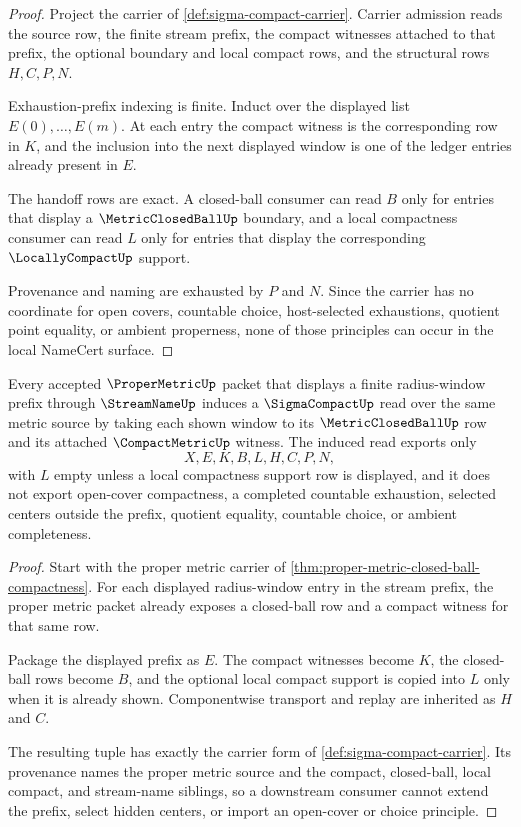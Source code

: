 \begin{proof}
Project the carrier of \autoref{def:sigma-compact-carrier}. Carrier admission reads the source row, the finite stream prefix, the compact witnesses attached to that prefix, the optional boundary and local compact rows, and the structural rows $H,C,P,N$.

Exhaustion-prefix indexing is finite. Induct over the displayed list $E(0),\ldots,E(m)$. At each entry the compact witness is the corresponding row in $K$, and the inclusion into the next displayed window is one of the ledger entries already present in $E$.

The handoff rows are exact. A closed-ball consumer can read $B$ only for entries that display a $\MetricClosedBallUp$ boundary, and a local compactness consumer can read $L$ only for entries that display the corresponding $\LocallyCompactUp$ support.

Provenance and naming are exhausted by $P$ and $N$. Since the carrier has no coordinate for open covers, countable choice, host-selected exhaustions, quotient point equality, or ambient properness, none of those principles can occur in the local NameCert surface.
\end{proof}

\begin{theorem}\label{thm:sigma-compact-proper-metric-exhaustion}
Every accepted $\ProperMetricUp$ packet that displays a finite radius-window prefix through $\StreamNameUp$ induces a $\SigmaCompactUp$ read over the same metric source by taking each shown window to its $\MetricClosedBallUp$ row and its attached $\CompactMetricUp$ witness. The induced read exports only
$$
X,E,K,B,L,H,C,P,N ,
$$
with $L$ empty unless a local compactness support row is displayed, and it does not export open-cover compactness, a completed countable exhaustion, selected centers outside the prefix, quotient equality, countable choice, or ambient completeness.
\end{theorem}
\begin{proof}
Start with the proper metric carrier of \autoref{thm:proper-metric-closed-ball-compactness}. For each displayed radius-window entry in the stream prefix, the proper metric packet already exposes a closed-ball row and a compact witness for that same row.

Package the displayed prefix as $E$. The compact witnesses become $K$, the closed-ball rows become $B$, and the optional local compact support is copied into $L$ only when it is already shown. Componentwise transport and replay are inherited as $H$ and $C$.

The resulting tuple has exactly the carrier form of \autoref{def:sigma-compact-carrier}. Its provenance names the proper metric source and the compact, closed-ball, local compact, and stream-name siblings, so a downstream consumer cannot extend the prefix, select hidden centers, or import an open-cover or choice principle.
\end{proof}

